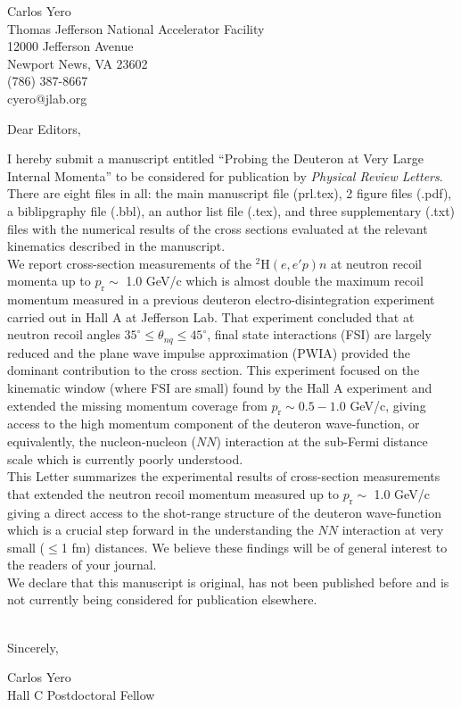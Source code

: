 \documentclass{letter}
\begin{document}
\begin{letter}{Carlos Yero\\
Thomas Jefferson National Accelerator Facility\\
12000 Jefferson Avenue \\
Newport News, VA 23602\\
(786) 387-8667 \\
cyero@jlab.org
  }


\opening{Dear Editors,\\}

I hereby submit a manuscript entitled ``Probing the Deuteron at Very Large Internal Momenta'' to be considered
for publication by \textit{Physical Review Letters}. There are eight files in all: the main manuscript file (prl.tex), 2 figure files (.pdf),
a biblipgraphy file (.bbl), an author list file (.tex), and three supplementary (.txt) files with the numerical results of the
cross sections evaluated at the relevant kinematics described in the manuscript.\\

We report cross-section measurements of the $^{2}$H$(e,e'p)n$ at neutron recoil momenta up to $p_{\mathrm{r}}\sim$ 1.0 GeV/c which is almost
double the maximum recoil momentum measured in a previous deuteron electro-disintegration experiment carried out in Hall A at Jefferson Lab. 
That experiment concluded that at neutron recoil angles $35^{\circ}\leq \theta_{nq}\leq 45^{\circ}$, final state interactions (FSI) are largely
reduced and the plane wave impulse approximation (PWIA) provided the dominant contribution to the cross section. This experiment focused
on the kinematic window (where FSI are small) found by the Hall A experiment and extended the missing momentum coverage from $p_{\mathrm{r}}\sim0.5 - 1.0$ GeV/c, giving
access to the high momentum component of the deuteron wave-function, or equivalently, the nucleon-nucleon ($NN$) interaction at the sub-Fermi
distance scale which is currently poorly understood.\\

This Letter summarizes the experimental results of cross-section measurements that extended the neutron recoil momentum measured up to $p_{\mathrm{r}}\sim$ 1.0 GeV/c giving a direct access
to the shot-range structure of the deuteron wave-function which is a crucial step forward in the understanding the $NN$ interaction at very small ($\leq$1 fm) distances. We believe these
findings will be of general interest to the readers of your journal.\\

We declare that this manuscript is original, has not been published before and is not currently being considered for publication elsewhere.\\
\\
\closing{Sincerely,
}

Carlos Yero\\
Hall C Postdoctoral Fellow\\
\end{letter}
\end{document}

